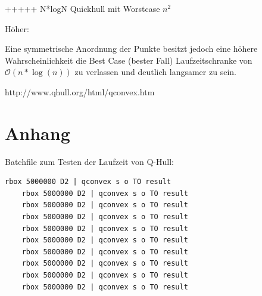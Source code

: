 \documentclass[conference]{IEEEtran}
\begin{document}
+++++
N*logN Quickhull mit Worstcase $n^2$

Höher: 

Eine symmetrische Anordnung der Punkte besitzt jedoch eine höhere Wahrscheinlichkeit die Best Case (bester Fall) Laufzeitschranke von $\mathcal{O}(n * \log(n))$ zu verlassen und deutlich langsamer zu sein.
 
	
	
	\begin{thebibliography}{00}
		 http://www.qhull.org/html/qconvex.htm
	\end{thebibliography}
	
	
	
	\section{Anhang}

	Batchfile zum Testen der Laufzeit von Q-Hull:
	\begin{lstlisting}[basicstyle=\tiny]
	rbox 5000000 D2 | qconvex s o TO result
	rbox 5000000 D2 | qconvex s o TO result
	rbox 5000000 D2 | qconvex s o TO result
	rbox 5000000 D2 | qconvex s o TO result
	rbox 5000000 D2 | qconvex s o TO result
	rbox 5000000 D2 | qconvex s o TO result
	rbox 5000000 D2 | qconvex s o TO result
	rbox 5000000 D2 | qconvex s o TO result
	rbox 5000000 D2 | qconvex s o TO result
	rbox 5000000 D2 | qconvex s o TO result
	\end{lstlisting}	
\end{document}
